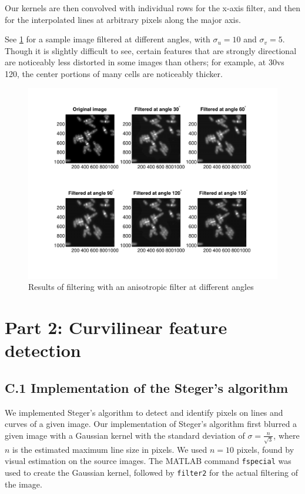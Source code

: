 \documentclass{article}
\begin{document}
Our kernels are then convolved with individual rows for the x-axis filter, and then for the interpolated lines at arbitrary pixels along the major axis.

See \ref{fig:anisotropic_filtering} for a sample image filtered at different angles, with $\sigma_u = 10$ and $\sigma_v = 5$. Though it is slightly difficult to see, certain features that are strongly directional are noticeably less distorted in some images than others; for example, at 30\degree vs 120\degree, the center portions of many cells are noticeably thicker.

\begin{figure}[h]
\centering
\includegraphics[width=0.95\linewidth]{figures/anisotropic_filtering.pdf}
\caption{Results of filtering with an anisotropic filter at different angles}
\label{fig:anisotropic_filtering}
\end{figure}


\pagebreak
\section*{Part 2: Curvilinear feature detection}

\subsection*{C.1 Implementation of the Steger's algorithm}

We implemented Steger's algorithm to detect and identify pixels on lines and curves of a given image. Our implementation of Steger's algorithm first blurred a given image with a Gaussian kernel with the standard deviation of $\sigma = \frac{n}{\sqrt{3}}$, where $n$ is the estimated maximum line size in pixels. We used $n = 10$ pixels, found by visual estimation on the source images. The MATLAB command \texttt{fspecial} was used to create the Gaussian kernel, followed by \texttt{filter2} for the actual filtering of the image.
\end{document}
